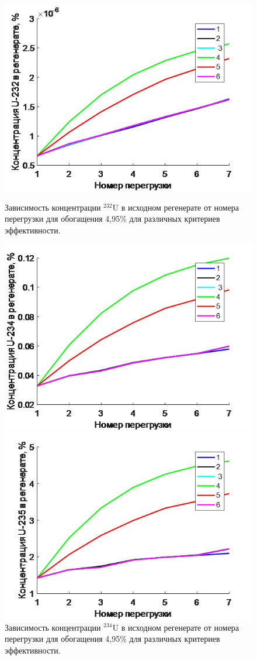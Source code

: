 \begin{figure}[ht]
    \begin{minipage}{.5\textwidth}
      \centering
      \includegraphics[width=.8\linewidth]{images/net/8}  
      \caption{Зависимость концентрации $^{232}$U в исходном регенерате от номера перегрузки для обогащения 4,95\% для различных критериев эффективности.}
      \label{8}
    \end{minipage}
    \begin{minipage}{.5\textwidth}
      \centering
      \includegraphics[width=.8\linewidth]{images/net/9}  
      \caption{Зависимость концентрации $^{234}$U в исходном регенерате от номера перегрузки для обогащения 4,95\% для различных критериев эффективности.}
      \label{9}
    \end{minipage}
    \begin{minipage}{.5\textwidth}
      \centering
      \includegraphics[width=.8\linewidth]{images/net/10}  

\end{minipage}
\end{figure}
